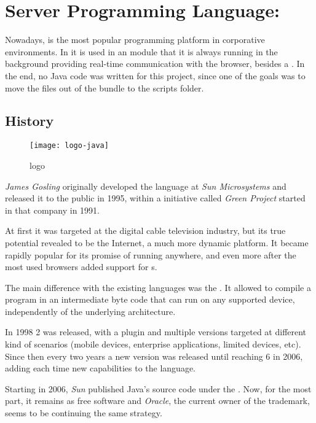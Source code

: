 \section{Server Programming Language: } %
\label{sec:java}

Nowadays,  is the most popular programming platform in corporative environments.
In  it is used in an  module that it is always running in the background providing real-time communication with the browser, besides a .
In the end, no Java code was written for this project, since one of the goals was to move the files out of the  bundle to the  scripts folder.

\subsection{History} %
\label{sub:javahistory}

\begin{wrapfigure}{r}{0.5\textwidth}
  \centering
    \texttt{[image: logo-java]}
  \caption{ logo}
  \label{fig:logo-java}
\end{wrapfigure}

\emph{James Gosling} originally developed the language at \emph{Sun Microsystems} and released it to the public in 1995, within a initiative called \emph{Green Project} started in that company in 1991.

At first it was targeted at the digital cable television industry, but its true potential revealed to be the Internet, a much more dynamic platform.
It became rapidly popular for its promise of running anywhere, and even more after the most used browsers added support for s.

The main difference with the existing languages was the .
It allowed to compile a program in an intermediate byte code that can run on any  supported device, independently of the underlying architecture.

In 1998  2 was released, with a  plugin and multiple versions targeted at different kind of scenarios (mobile devices, enterprise applications, limited devices, etc).
Since then every two years a new version was released until reaching  6 in 2006, adding each time new capabilities to the language.

Starting in 2006, \emph{Sun} published Java's source code under the . Now, for the most part, it remains as free software and \emph{Oracle}, the current owner of the trademark, seems to be continuing the same strategy.

